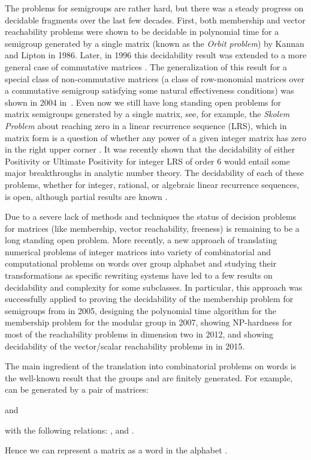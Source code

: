 \documentclass[fontsize=11pt,DIV=13,paper=letter]{scrartcl}
\theoremstyle{definition}
\begin{document}
The problems for semigroups are rather hard, but there was a steady progress on decidable fragments over the last few decades.
First, both membership and vector reachability problems were shown to be decidable in polynomial time
for a semigroup generated by a single   matrix (known as the {\sl Orbit problem}) by Kannan and Lipton \cite{KL86} in 1986.
Later, in 1996 this decidability result was extended to a more general case of  
commutative matrices \cite{Babai}.
The generalization of this result for a special class of non-commutative matrices
(a class of row-monomial matrices over a commutative semigroup satisfying some natural effectiveness conditions)
was shown in 2004 in~\cite{LP2004}.
Even now we still have long standing open problems for matrix semigroups generated by a single matrix,
see, for example, the {\sl Skolem Problem} about reaching zero in a linear recurrence sequence (LRS), which in matrix 
form is a question of whether any power of a given integer matrix  has zero in the right upper corner \cite{STOC2013,COW_JACM}. It was recently shown
that the decidability of either Positivity or Ultimate Positivity
for integer LRS of order 6 would entail some major breakthroughs
in analytic number theory. The decidability of each of
these problems, whether for integer, rational, or algebraic
linear recurrence sequences, is open, although partial results
are known \cite{GOW_STACS2015,OSW2015,OW_ICALP2015-1,OW_ICALP2015-2}.

Due to a severe lack of methods and techniques the status of decision problems for  matrices (like membership, vector reachability, freeness) is remaining to be a long standing open problem. More recently, a new approach of translating numerical problems of  integer matrices into variety of combinatorial and computational problems on words over group alphabet and studying their transformations as specific rewriting systems have  led to a few results on decidability and complexity for some subclasses. 
In particular, this approach was successfully applied to proving the decidability of the membership problem for semigroups from  \cite{CK2005} in 2005,  designing the polynomial time algorithm for the membership problem for the modular group \cite{Gurevich2007} in 2007,  showing NP-hardness for most of the reachability problems in dimension two \cite{BP2012,BHP2012} in 2012,
and showing decidability of the vector/scalar reachability problems in  \cite{PS15} in 2015.

The main ingredient of the translation into combinatorial problems on words is the well-known result that the groups  and  are finitely generated. For example,  can be generated by a pair of matrices: 
\begin{center}
 and

with the following relations: ,  and .
\end{center}
Hence we can represent a matrix  as a word in the alphabet .
\end{document}

